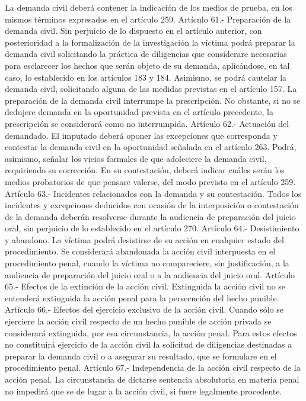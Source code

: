     La demanda civil deberá contener la indicación de los medios de prueba, en los mismos términos expresados en el artículo 259.
    Artículo 61.- Preparación de la demanda civil. Sin perjuicio de lo dispuesto en el artículo anterior, con posterioridad a la formalización de la investigación la víctima podrá preparar la demanda civil solicitando la práctica de diligencias que considerare necesarias para esclarecer los hechos que serán objeto de su demanda, aplicándose, en tal caso, lo establecido en los artículos 183 y 184.
    Asimismo, se podrá cautelar la demanda civil, solicitando alguna de las medidas previstas en el artículo 157.
    La preparación de la demanda civil interrumpe la prescripción. No obstante, si no se dedujere demanda en la oportunidad prevista en el artículo precedente, la prescripción se considerará como no interrumpida.
    Artículo 62.- Actuación del demandado. El imputado deberá oponer las excepciones que corresponda y contestar la demanda civil en la oportunidad señalada en el artículo 263. Podrá, asimismo, señalar los vicios formales de que adoleciere la demanda civil, requiriendo su corrección.
    En su contestación, deberá indicar cuáles serán los medios probatorios de que pensare valerse, del modo previsto en el artículo 259.
    Artículo 63.- Incidentes relacionados con la demanda y su contestación. Todos los incidentes y excepciones deducidos con ocasión de la interposición o contestación de la demanda deberán resolverse durante la audiencia de preparación del juicio oral, sin perjuicio de lo establecido en el artículo 270.
    Artículo 64.- Desistimiento y abandono. La víctima podrá desistirse de su acción en cualquier estado del procedimiento.
    Se considerará abandonada la acción civil interpuesta en el procedimiento penal, cuando la víctima no compareciere, sin justificación, a la audiencia de preparación del juicio oral o a la audiencia del juicio oral.
    Artículo 65.- Efectos de la extinción de la acción civil. Extinguida la acción civil no se entenderá extinguida la acción penal para la persecución del hecho punible.
    Artículo 66.- Efectos del ejercicio exclusivo de la acción civil. Cuando sólo se ejerciere la acción civil respecto de un hecho punible de acción privada se considerará extinguida, por esa circunstancia, la acción penal.
    Para estos efectos no constituirá ejercicio de la acción civil la solicitud de diligencias destinadas a preparar la demanda civil o a asegurar su resultado, que se formulare en el procedimiento penal.
    Artículo 67.- Independencia de la acción civil respecto de la acción penal. La circunstancia de dictarse sentencia absolutoria en materia penal no impedirá que se de lugar a la acción civil, si fuere legalmente procedente.
